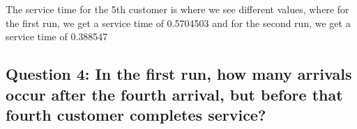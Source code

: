 \documentclass[
]{article}
\newenvironment{Shaded}{\begin{snugshade}}{\end{snugshade}}
\newcommand{\AttributeTok}[1]{\textcolor[rgb]{0.77,0.63,0.00}{#1}}
\newcommand{\DecValTok}[1]{\textcolor[rgb]{0.00,0.00,0.81}{#1}}
\newcommand{\FloatTok}[1]{\textcolor[rgb]{0.00,0.00,0.81}{#1}}
\newcommand{\FunctionTok}[1]{\textcolor[rgb]{0.00,0.00,0.00}{#1}}
\newcommand{\NormalTok}[1]{#1}
\newcommand{\OtherTok}[1]{\textcolor[rgb]{0.56,0.35,0.01}{#1}}
\newcommand{\SpecialCharTok}[1]{\textcolor[rgb]{0.00,0.00,0.00}{#1}}
\newcommand{\StringTok}[1]{\textcolor[rgb]{0.31,0.60,0.02}{#1}}
\begin{document}
The service time for the 5th customer is where we see different values,
where for the first run, we get a service time of 0.5704503 and for the
second run, we get a service time of 0.388547

\hypertarget{question-4-in-the-first-run-how-many-arrivals-occur-after-the-fourth-arrival-but-before-that-fourth-customer-completes-service}{%
\subsection{Question 4: In the first run, how many arrivals occur after
the fourth arrival, but before that fourth customer completes
service?}\label{question-4-in-the-first-run-how-many-arrivals-occur-after-the-fourth-arrival-but-before-that-fourth-customer-completes-service}}

\begin{Shaded}
\end{Shaded}
\end{document}
